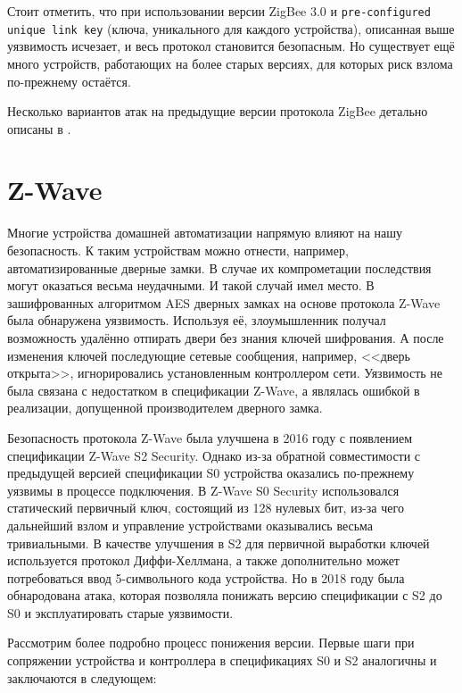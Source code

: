 	Стоит отметить, что при использовании версии ZigBee 3.0 и \texttt{pre-configured unique link key} (ключа,
	уникального для каждого устройства), описанная выше уязвимость исчезает, и весь протокол
	становится безопасным. Но существует ещё много устройств, работающих на более старых версиях,
	для которых риск взлома по-прежнему остаётся.
	
	Несколько вариантов атак на предыдущие версии протокола ZigBee детально описаны в 
	\cite{zigbee-attacks}.


	\section{Z-Wave}
	
	
	Многие устройства домашней автоматизации напрямую влияют на
	нашу безопасность. К таким устройствам можно отнести, например, автоматизированные дверные замки.
	В случае их компрометации последствия могут оказаться весьма неудачными. И такой случай
	имел место. В зашифрованных алгоритмом AES дверных замках на основе протокола Z-Wave была 
	обнаружена уязвимость. Используя её, злоумышленник получал возможность удалённо отпирать 
	двери без знания ключей шифрования. А после изменения ключей последующие сетевые сообщения, 
	например, <<дверь открыта>>, игнорировались установленным контроллером сети.
	Уязвимость не была связана с недостатком в спецификации Z-Wave, а являлась ошибкой 
	в реализации, допущенной производителем дверного замка.
	
	Безопасность протокола Z-Wave была улучшена в 2016 году с появлением спецификации Z-Wave S2 
	Security. Однако из-за обратной совместимости с предыдущей версией спецификации S0 устройства
	оказались по-прежнему уязвимы в процессе подключения. В Z-Wave S0 Security использовался статический
	первичный ключ, состоящий из 128 нулевых бит, из-за чего дальнейший взлом и управление устройствами 
	оказывались весьма тривиальными. В качестве улучшения в S2 для первичной выработки ключей 
	используется протокол Диффи-Хеллмана, а также дополнительно может потребоваться ввод 5-символьного
	кода устройства. Но в 2018 году была обнародована атака, которая позволяла понижать версию 
	спецификации с S2 до S0 и эксплуатировать старые уязвимости.
	
	
	Рассмотрим более подробно процесс понижения версии. Первые шаги при сопряжении устройства и 
	контроллера в спецификациях S0 и S2 аналогичны и заключаются в следующем:
	
